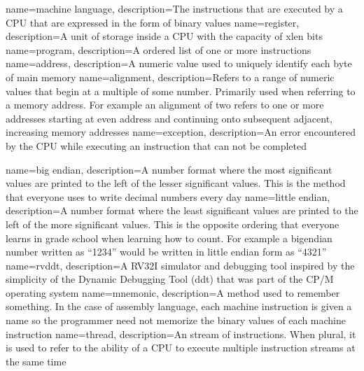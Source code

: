 {
	name={machine language},
	description={The instructions that are executed by a CPU that are expressed
		in the form of \gls{binary} values}
}
{
	name={register},
	description={A unit of storage inside a CPU with the capacity of \gls{xlen} \gls{bit}s}
}
{
	name={program},
	description={A ordered list of one or more instructions}
}
{
	name={address},
	description={A numeric value used to uniquely identify each \gls{byte} of main memory}
}
{
	name={alignment},
	description={Refers to a range of numeric values that begin 
		at a multiple of some number.  Primarily used when referring to
		a memory address.  For example an alignment of two refers to one
		or more addresses starting at even address and continuing onto
		subsequent adjacent, increasing memory addresses}
}
{
	name={exception},
	description={An error encountered by the CPU while executing an instruction
		that can not be completed}
}

{
	name={big endian},
	description={A number format where the most significant values are 
	printed to the left of the lesser significant values.  This is the
	method that everyone uses to write decimal numbers every day}
}
{
	name={little endian},
	description={A number format where the least significant values are 
		printed to the left of the more significant values.  This is the
		opposite ordering that everyone learns in grade school when learning
		how to count.  For example a \gls{bigendian} number written as ``1234''
		would be written in little endian form as ``4321''}
}
{
	name={rvddt},
	description={A RV32I simulator and debugging tool inspired by the 
		simplicity of the Dynamic Debugging Tool (ddt) that was part of 
		the CP/M operating system}
}
{
	name={mnemonic},
	description={A method used to remember something.  In the case of
		assembly language, each machine instruction is given a name
		so the programmer need not memorize the binary values of each
		machine instruction}
}
{
	name={thread},
	description={An stream of instructions.  When plural, it is
		used to refer to the ability of a CPU to execute multiple 
		instruction streams at the same time}
}

